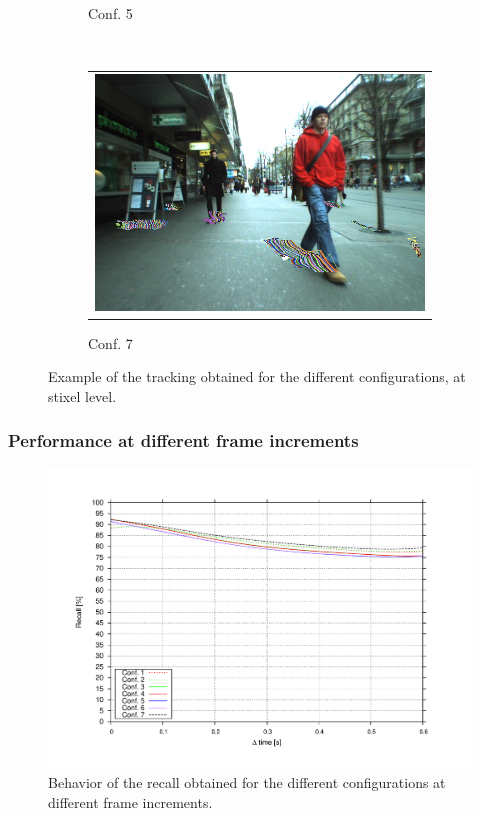 \begin{figure}[t]
\begin{subfigure}[b]{0.3\textwidth}
\begin{tabular}{c}
	  \end{tabular}
	  \caption{Conf. 5}\label{fig:cp04_tracking_example_conf_5}
        \end{subfigure}%
        ~
        \begin{subfigure}[b]{0.3\textwidth}
	  \begin{tabular}{c}
	    \includegraphics[width=\textwidth]{trackingConf7}
	  \end{tabular}
	  \caption{Conf. 7}\label{fig:cp04_tracking_example_conf_7}
        \end{subfigure}%
        \caption{Example of the tracking obtained for the different configurations, at stixel level.}\label{fig:cp04_tracking_examples}
\end{figure}

\subsubsection{Performance at different frame increments}\label{ch:chapter04_02_03_02}

\begin{figure}[t]
\centering
\includegraphics[width=\textwidth,height=0.5\textwidth,trim=50 40 80 60,clip]{recall_vs_step}
\caption{Behavior of the recall obtained for the different configurations at different frame increments.}\label{fig:cp04_recall_vs_step}
\end{figure}

